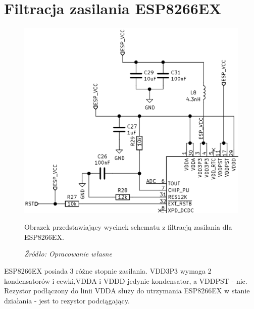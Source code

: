 \documentclass[12pt,a4paper,oneside]{memoir}
\begin{document}
\section{Filtracja zasilania ESP8266EX}
\begin{figure}[!h]
	\centering
	\includegraphics[scale=0.3]{images/sch/sch-13.png}
	{\tytulyrozdzialow \footnotesize \caption[Schemat - filtracja zasilania ESP8266EX] {Obrazek przedstawiający wycinek schematu z filtracją zasilania dla ESP8266EX.}}
	\caption*{\textit{Źródło: Opracowanie własne}}
\end{figure}
\par ESP8266EX posiada 3 różne stopnie zasilania. VDD3P3 wymaga 2 kondensatorów i cewki,VDDA i VDDD jedynie kondensator, a VDDPST - nic. Rezystor podłączony do linii VDDA służy do utrzymania ESP8266EX w stanie działania - jest to rezystor podciągający.
\newpage
\end{document}
